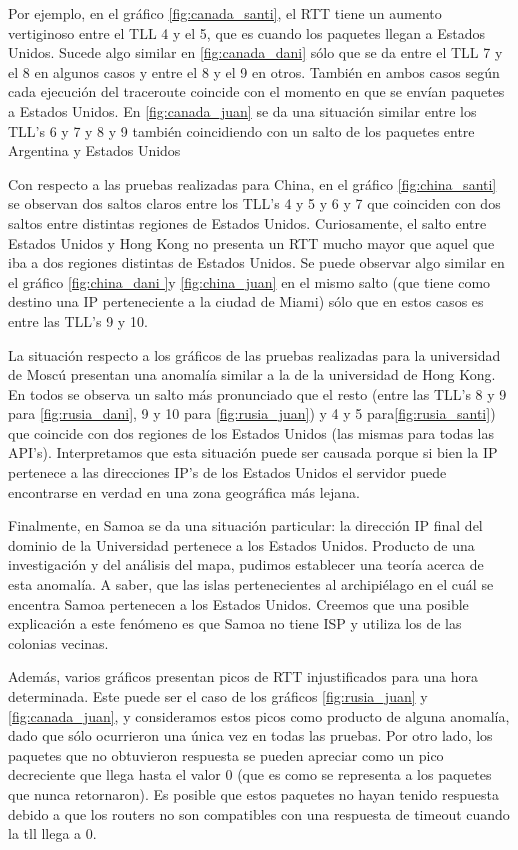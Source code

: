 Por ejemplo, en el gráfico \ref{fig:canada_santi}, el RTT tiene un aumento vertiginoso entre el TLL 4 y el 5, que es cuando los paquetes llegan a Estados Unidos. Sucede algo similar en \ref{fig:canada_dani} sólo que se da entre el TLL 7 y el 8 en algunos casos y entre el 8 y el 9 en otros. También en ambos casos según cada ejecución del traceroute coincide con el momento en que se envían paquetes a Estados Unidos. En \ref{fig:canada_juan} se da una situación similar entre los TLL's 6 y 7 y 8 y 9 también coincidiendo con un salto de los paquetes entre Argentina y Estados Unidos

Con respecto a las pruebas realizadas para China, en el gráfico \ref{fig:china_santi} se observan dos saltos claros entre los TLL's 4 y 5 y 6 y 7 que coinciden con dos saltos entre distintas regiones de Estados Unidos. Curiosamente, el salto entre Estados Unidos y Hong Kong no presenta un RTT mucho mayor que aquel que iba a dos regiones distintas de Estados Unidos. Se puede observar algo similar en el gráfico \ref{fig:china_dani }y \ref{fig:china_juan} en el mismo salto (que tiene como destino una IP perteneciente a la ciudad de Miami) sólo que en estos casos es entre las TLL's 9 y 10.

La situación respecto a los gráficos de las pruebas realizadas para la universidad de Moscú presentan una anomalía similar a la de la universidad de Hong Kong. En todos se observa un salto más pronunciado que el resto (entre las TLL's 8 y 9 para \ref{fig:rusia_dani}, 9 y 10 para \ref{fig:rusia_juan}) y 4 y 5 para\ref{fig:rusia_santi}) que coincide con dos regiones de los Estados Unidos (las mismas para todas las API's). Interpretamos que esta situación puede ser causada porque si bien la IP pertenece a las direcciones IP's de los Estados Unidos el servidor puede encontrarse en verdad en una zona geográfica más lejana.

Finalmente, en Samoa se da una situación particular: la dirección IP final del dominio de la Universidad pertenece a los Estados Unidos. Producto de una investigación y del análisis del mapa, pudimos establecer una teoría acerca de esta anomalía. A saber, que las islas pertenecientes al archipiélago en el cuál se encentra Samoa pertenecen a los Estados Unidos. Creemos que una posible explicación a este fenómeno es que Samoa no tiene ISP y utiliza los de las colonias vecinas.

Además, varios gráficos presentan picos de RTT injustificados para una hora determinada. Este puede ser el caso de los gráficos \ref{fig:rusia_juan} y \ref{fig:canada_juan}, y consideramos estos picos como producto de alguna anomalía, dado que sólo ocurrieron una única vez en todas las pruebas. Por otro lado, los paquetes que no obtuvieron respuesta se pueden apreciar como un pico decreciente que llega hasta el valor 0 (que es como se representa a los paquetes que nunca retornaron). Es posible que estos paquetes no hayan tenido respuesta debido a que los routers no son compatibles con una respuesta de timeout cuando la tll llega a 0.


